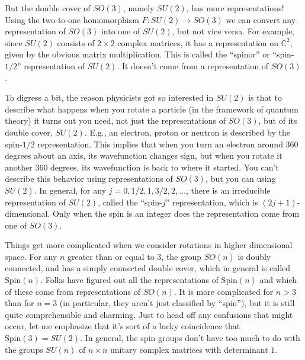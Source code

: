 \documentclass{article}
\begin{document}
But the double cover of \(SO(3)\), namely \(SU(2)\), has more
representations! Using the two-to-one homomorphism
\(F\colon SU(2) \to SO(3)\) we can convert any representation of
\(SO(3)\) into one of \(SU(2)\), but not vice versa. For example, since
\(SU(2)\) consists of \(2\times2\) complex matrices, it has a
representation on \(\mathbb{C}^2\), given by the obvious matrix
multiplication. This is called the ``spinor'' or ``spin-\(1/2\)''
representation of \(SU(2)\). It doesn't come from a representation of
\(SO(3)\).

To digress a bit, the reason physicists got so interested in \(SU(2)\)
is that to describe what happens when you rotate a particle (in the
framework of quantum theory) it turns out you need, not just the
representations of \(SO(3)\), but of its double cover, \(SU(2)\). E.g.,
an electron, proton or neutron is described by the spin-\(1/2\)
representation. This implies that when you turn an electron around 360
degrees about an axis, its wavefunction changes sign, but when you
rotate it another 360 degrees, its wavefunction is back to where it
started. You can't describe this behavior using representations of
\(SO(3)\), but you can using \(SU(2)\). In general, for any
\(j = 0, 1/2, 1, 3/2, 2, \ldots\), there is an irreducible
representation of \(SU(2)\), called the ``spin-\(j\)'' representation,
which is \((2j+1)\)-dimensional. Only when the spin is an integer does
the representation come from one of \(SO(3)\).

Things get more complicated when we consider rotations in higher
dimensional space. For any \(n\) greater than or equal to 3, the group
\(SO(n)\) is doubly connected, and has a simply connected double cover,
which in general is called \(\mathrm{Spin}(n)\). Folks have figured out
all the representations of \(\mathrm{Spin}(n)\) and which of these come
from representations of \(SO(n)\). It is more complicated for \(n > 3\)
than for \(n = 3\) (in particular, they aren't just classified by
``spin''), but it is still quite comprehensible and charming. Just to
head off any confusions that might occur, let me emphasize that it's
sort of a lucky coincidence that \(\mathrm{Spin}(3) = SU(2)\). In
general, the spin groups don't have too much to do with the groups
\(SU(n)\) of \(n\times n\) unitary complex matrices with determinant
\(1\).
\end{document}
